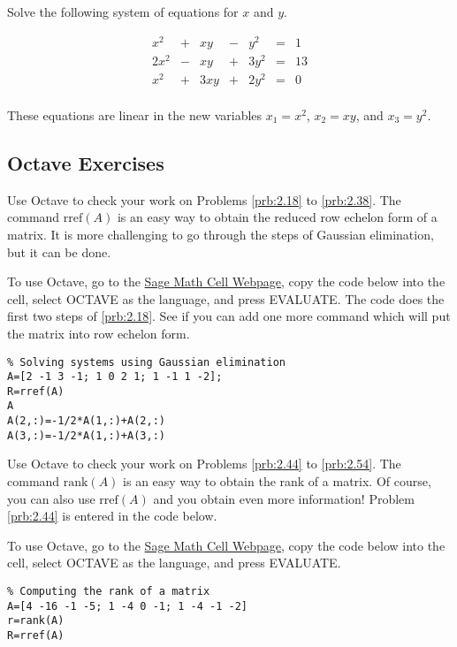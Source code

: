 \documentclass{ximera}
\begin{document}
\begin{problem}\label{prb:quadratic}
Solve the following system of equations for $x$ and $y$.

\begin{equation*}
\begin{array}{rlrlrcr}
	  x^2 & + &   xy & - &   y^2 & = &  1 \\
	 2x^2 & - &   xy & + &  3y^2 & = & 13 \\
	  x^2 & + &  3xy & + &  2y^2 & = &  0 \\
\end{array}
\end{equation*}

\begin{hint}
These equations are linear in the new variables $x_{1} = x^{2}$, $x_{2} = xy$, and $x_{3} = y^{2}$.
\end{hint}
\end{problem}


\subsection*{Octave Exercises}
\begin{problem}\label{oct:rref}
Use Octave to check your work on Problems \ref{prb:2.18} to \ref{prb:2.38}.  The command $\mbox{rref}(A)$ is an easy way to obtain the reduced row echelon form of a matrix.  It is more challenging to go through the steps of Gaussian elimination, but it can be done.

To use Octave, go to the \href{https://sagecell.sagemath.org/}{Sage Math Cell Webpage}, copy the code below into the cell, select OCTAVE as the language, and press EVALUATE.  The code does the first two steps of \ref{prb:2.18}.  See if you can add one more command which will put the matrix into row echelon form.

\begin{verbatim}
% Solving systems using Gaussian elimination
A=[2 -1 3 -1; 1 0 2 1; 1 -1 1 -2];
R=rref(A)
A
A(2,:)=-1/2*A(1,:)+A(2,:)
A(3,:)=-1/2*A(1,:)+A(3,:)
\end{verbatim}
\end{problem}

\begin{problem}\label{oct:rank}
Use Octave to check your work on Problems \ref{prb:2.44} to \ref{prb:2.54}.  The command $\mbox{rank}(A)$ is an easy way to obtain the rank of a matrix.  Of course, you can also use $\mbox{rref}(A)$ and you obtain even more information!  Problem \ref{prb:2.44} is entered in the code below.  

To use Octave, go to the \href{https://sagecell.sagemath.org/}{Sage Math Cell Webpage}, copy the code below into the cell, select OCTAVE as the language, and press EVALUATE.

\begin{verbatim}
% Computing the rank of a matrix
A=[4 -16 -1 -5; 1 -4 0 -1; 1 -4 -1 -2]
r=rank(A)
R=rref(A)
\end{verbatim}
\end{problem}
\end{document}
